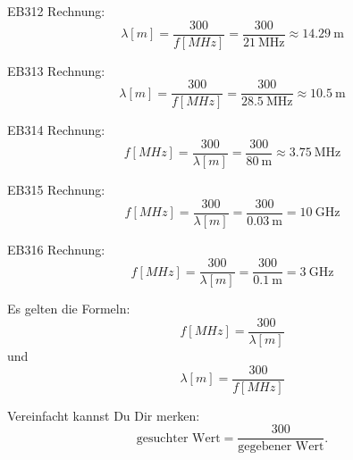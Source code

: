 \begin{sol}{EB312}
  Rechnung:
  $$\lambda[m] = \frac{300}{f[MHz]} = \frac{300}{\SI{21}{\mega\hertz}}\approx \SI{14,29}{\meter} $$
\end{sol}

\begin{sol}{EB313}
  Rechnung:
  $$\lambda[m] = \frac{300}{f[MHz]} = \frac{300}{\SI{28.5}{\mega\hertz}}\approx \SI{10,5}{\meter} $$
\end{sol}

\begin{sol}{EB314}
  Rechnung:
  $$ f[MHz] = \frac{300}{\lambda[m]} = \frac{300}{\SI{80}{\meter}}\approx \SI{3.75}{\mega\hertz} $$
\end{sol}

\begin{sol}{EB315}
  Rechnung:
  $$ f[MHz] = \frac{300}{\lambda[m]} = \frac{300}{\SI{0,03}{\meter}}= \SI{10}{\giga\hertz} $$
\end{sol}

\begin{sol}{EB316}
  Rechnung:
  $$ f[MHz] = \frac{300}{\lambda[m]} = \frac{300}{\SI{0,1}{\meter}}= \SI{3}{\giga\hertz} $$
\end{sol}



\begin{ohmchapter}
    Es gelten die Formeln:
     $$ f[MHz] = \frac{300}{\lambda[m]} $$
     und $$\lambda[m] = \frac{300}{f[MHz]} $$

     Vereinfacht kannst Du Dir merken:
     $$ \text{gesuchter Wert} = \frac{300}{\text{gegebener Wert}}.$$
\end{ohmchapter} 
